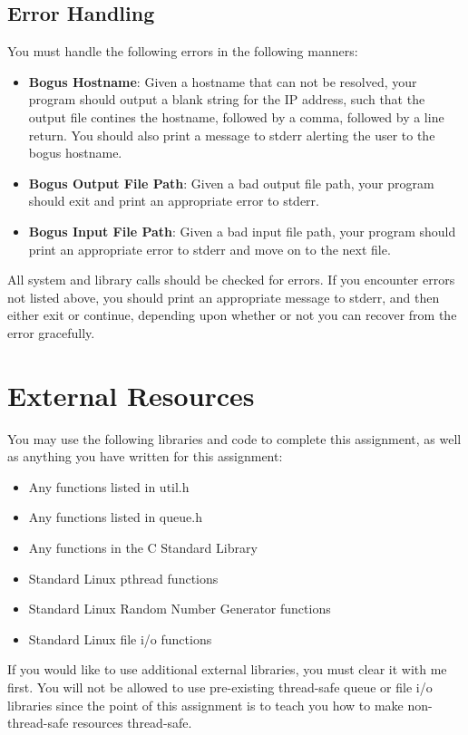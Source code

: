 \documentclass[12pt]{article}
\begin{document}
\subsection{Error Handling}
You must handle the following errors in the following manners:

\begin{itemize}
\item {\bf Bogus Hostname}: Given a hostname that can not be resolved,
  your program should output a blank string for the IP address, such
  that the output file contines the hostname, followed by a comma,
  followed by a line return. You should also print a message to stderr
  alerting the user to the bogus hostname.
\item {\bf Bogus Output File Path}: Given a bad output file path, your
  program should exit and print an appropriate error to stderr.
\item {\bf Bogus Input File Path}: Given a bad input file path, your
  program should print an appropriate error to stderr and move on to
  the next file.
\end{itemize}

All system and library calls should be checked for errors.
If you encounter
errors not listed above, you should print an appropriate message to
stderr, and then either exit or continue, depending upon whether or not
you can recover from the error gracefully.

\section{External Resources}
You may use the following libraries and code to complete this
assignment, as well as anything you have written for this assignment:

\begin{itemize}
  \item Any functions listed in util.h
  \item Any functions listed in queue.h
  \item Any functions in the C Standard Library
  \item Standard Linux pthread functions  
  \item Standard Linux Random Number Generator functions
  \item Standard Linux file i/o functions
\end{itemize}

If you would like to use additional external libraries, you must clear
it with me first. You will not be allowed to use pre-existing
thread-safe queue or file i/o libraries since the point of this
assignment is to teach you how to make non-thread-safe resources
thread-safe.
\end{document}

